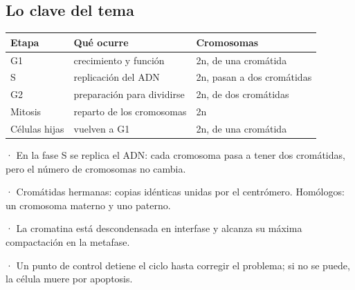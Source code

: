 \subsection{Lo clave del tema}
\begin{center}\small
\begin{tabularx}{\linewidth}{@{}>{\raggedright\arraybackslash\hsize=0.60\hsize}X>{\raggedright\arraybackslash\hsize=1.20\hsize}X>{\raggedright\arraybackslash\hsize=1.20\hsize}X@{}}
\toprule
\textbf{Etapa} & \textbf{Qué ocurre} & \textbf{Cromosomas} \\
\midrule
G1 & crecimiento y función & 2n, de una cromátida \\
S & replicación del ADN & 2n, pasan a dos cromátidas \\
G2 & preparación para dividirse & 2n, de dos cromátidas \\
Mitosis & reparto de los cromosomas & 2n \\
Células hijas & vuelven a G1 & 2n, de una cromátida \\
\bottomrule
\end{tabularx}
\end{center}
 
\begin{clave}[{Recuerda}] · En la fase S se replica el ADN: cada cromosoma pasa a tener dos cromátidas, pero el número de cromosomas no cambia.\par · Cromátidas hermanas: copias idénticas unidas por el centrómero. Homólogos: un cromosoma materno y uno paterno.\par · La cromatina está descondensada en interfase y alcanza su máxima compactación en la metafase.\par · Un punto de control detiene el ciclo hasta corregir el problema; si no se puede, la célula muere por apoptosis.\end{clave}
 
